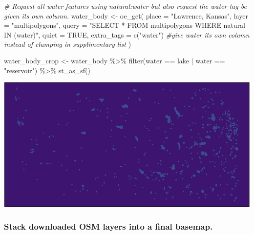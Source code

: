 \documentclass[
  paper=a4,
  ,captions=tableheading
]{scrartcl}
\newenvironment{Shaded}{\begin{snugshade}}{\end{snugshade}}
\newcommand{\AttributeTok}[1]{\textcolor[rgb]{0.77,0.63,0.00}{#1}}
\newcommand{\CommentTok}[1]{\textcolor[rgb]{0.56,0.35,0.01}{\textit{#1}}}
\newcommand{\ConstantTok}[1]{\textcolor[rgb]{0.00,0.00,0.00}{#1}}
\newcommand{\FunctionTok}[1]{\textcolor[rgb]{0.00,0.00,0.00}{#1}}
\newcommand{\NormalTok}[1]{#1}
\newcommand{\OtherTok}[1]{\textcolor[rgb]{0.56,0.35,0.01}{#1}}
\newcommand{\SpecialCharTok}[1]{\textcolor[rgb]{0.00,0.00,0.00}{#1}}
\newcommand{\StringTok}[1]{\textcolor[rgb]{0.31,0.60,0.02}{#1}}
\begin{document}
\begin{Shaded}
\begin{Highlighting}[]
\CommentTok{\# Request all water features using natural:water but also request the water tag be given it\textquotesingle{}s own column. }
\NormalTok{water\_body }\OtherTok{\textless{}{-}} \FunctionTok{oe\_get}\NormalTok{(}
  \AttributeTok{place =} \StringTok{"Lawrence, Kansas"}\NormalTok{, }
  \AttributeTok{layer =} \StringTok{"multipolygons"}\NormalTok{,}
  \AttributeTok{query =} \StringTok{"SELECT * FROM multipolygons WHERE natural IN (\textquotesingle{}water\textquotesingle{})"}\NormalTok{,}
  \AttributeTok{quiet =} \ConstantTok{TRUE}\NormalTok{,}
  \AttributeTok{extra\_tags =} \FunctionTok{c}\NormalTok{(}\StringTok{"water"}\NormalTok{) }\CommentTok{\#give water it\textquotesingle{}s own column instead of clumping in supplimentary list}
\NormalTok{)}

\NormalTok{water\_body\_crop }\OtherTok{\textless{}{-}}\NormalTok{ water\_body }\SpecialCharTok{\%\textgreater{}\%}
  \FunctionTok{filter}\NormalTok{(water }\SpecialCharTok{==} \StringTok{\textquotesingle{}lake\textquotesingle{}} \SpecialCharTok{|}\NormalTok{ water }\SpecialCharTok{==} \StringTok{"reservoir"}\NormalTok{) }\SpecialCharTok{\%\textgreater{}\%}
  \FunctionTok{st\_as\_sf}\NormalTok{() }
\end{Highlighting}
\end{Shaded}

\includegraphics{Haskell_files/figure-latex/unnamed-chunk-28-1.pdf}

\hypertarget{stack-downloaded-osm-layers-into-a-final-basemap.}{%
\subsubsection{Stack downloaded OSM layers into a final
basemap.}\label{stack-downloaded-osm-layers-into-a-final-basemap.}}
\end{document}
